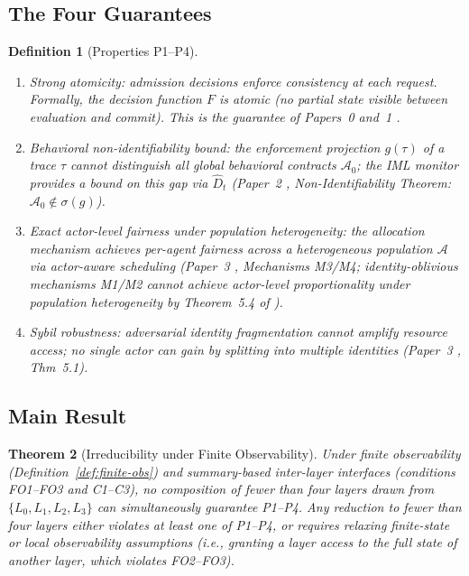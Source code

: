 \documentclass[11pt]{article}
\newtheorem{theorem}{Theorem}[section]
\newtheorem{definition}[theorem]{Definition}
\newcommand{\Agents}{\mathcal{A}}
\newcommand{\Dhat}{\widehat{D}}
\newcommand{\Azero}{\mathcal{A}_0}
\newcommand{\Layer}[1]{L_{#1}}
\begin{document}
\subsection{The Four Guarantees}

\begin{definition}[Properties P1--P4]
\label{def:properties}
\begin{enumerate}[label=(P\arabic*),noitemsep]
  \item \emph{Strong atomicity}: admission decisions enforce consistency at
    each request. Formally, the decision function $F$ is atomic (no partial
    state visible between evaluation and commit). This is the guarantee of
    Papers~0 and~1 \cite{fernandez2026a,fernandez2026b}.
  \item \emph{Behavioral non-identifiability bound}: the enforcement
    projection $g(\tau)$ of a trace $\tau$ cannot distinguish all global
    behavioral contracts $\Azero$; the IML monitor provides a bound on this
    gap via $\Dhat_t$ (Paper~2 \cite{fernandez2026c}, Non-Identifiability
    Theorem: $\Azero \notin \sigma(g)$).
  \item \emph{Exact actor-level fairness under population heterogeneity}:
    the allocation mechanism achieves per-agent fairness across a
    heterogeneous population $\Agents$ via actor-aware scheduling
    (Paper~3 \cite{fairgov26}, Mechanisms M3/M4; identity-oblivious
    mechanisms M1/M2 cannot achieve actor-level proportionality under
    population heterogeneity by Theorem~5.4 of \cite{fairgov26}).
  \item \emph{Sybil robustness}: adversarial identity fragmentation cannot
    amplify resource access; no single actor can gain by splitting into
    multiple identities (Paper~3 \cite{fairgov26}, Thm~5.1).
\end{enumerate}
\end{definition}

\subsection{Main Result}

\begin{theorem}[Irreducibility under Finite Observability]
\label{thm:irreducibility}
Under finite observability (Definition~\ref{def:finite-obs}) and
summary-based inter-layer interfaces (conditions FO1--FO3 and C1--C3),
no composition of fewer than four layers drawn from
$\{\Layer{0},\Layer{1},\Layer{2},\Layer{3}\}$ can simultaneously guarantee
P1--P4.  Any reduction to fewer than four layers either violates at least
one of P1--P4, or requires relaxing finite-state or local observability
assumptions (i.e., granting a layer access to the full state of another
layer, which violates FO2--FO3).
\end{theorem}
\end{document}
